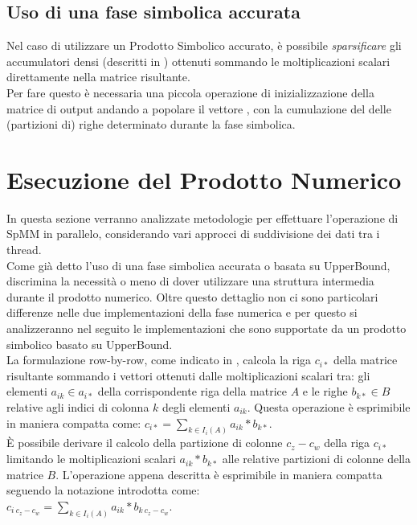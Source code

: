 \subsection{Uso di una fase simbolica accurata}
Nel caso di utilizzare un Prodotto Simbolico accurato, è possibile \emph{sparsificare}
gli accumulatori densi (descritti in ) ottenuti sommando le moltiplicazioni scalari
direttamente nella matrice risultante.\\
Per fare questo è necessaria una piccola operazione di inizializzazione della matrice di output
andando a popolare il vettore , con la cumulazione del \nnnz delle 
(partizioni di) righe determinato durante la fase simbolica.\\

\section{Esecuzione del Prodotto Numerico}
In questa sezione verranno analizzate metodologie per effettuare l'operazione di SpMM in parallelo,
considerando vari approcci di suddivisione dei dati tra i thread.\\
Come già detto l'uso di una fase simbolica accurata o basata su UpperBound, discrimina la necessità 
o meno di dover utilizzare una struttura intermedia durante il prodotto numerico.
Oltre questo dettaglio non ci sono particolari differenze nelle due implementazioni della fase numerica
e per questo si analizzeranno nel seguito le implementazioni che sono supportate da un prodotto simbolico basato su UpperBound.\\
La formulazione row-by-row, come indicato in , 
calcola la riga $c_{i*}$ della matrice risultante sommando i vettori ottenuti dalle moltiplicazioni scalari tra:
gli elementi $a_{ik} \in a_{i*}$ della corrispondente riga della matrice $A$ e  
le righe $b_{k*} \in B$ relative agli indici di colonna $k$ degli elementi $a_{ik}$.
Questa operazione è esprimibile in maniera compatta come:
$c_{i*} = \sum\limits_{k \in I_i(A)}  a_{ik} \ast  b_{k*}$.\\
È possibile derivare il calcolo della partizione di colonne $c_z - c_w$ della riga $c_{i*}$
limitando le moltiplicazioni scalari $a_{ik} \ast  b_{k*}$ alle relative partizioni di colonne della matrice $B$. 
L'operazione appena descritta è esprimibile in maniera compatta seguendo la notazione introdotta  come:\\
$c_{i~c_z-c_w} = \sum\limits_{k \in I_i(A)}  a_{ik} \ast  b_{k~c_z-c_w}$.\\

